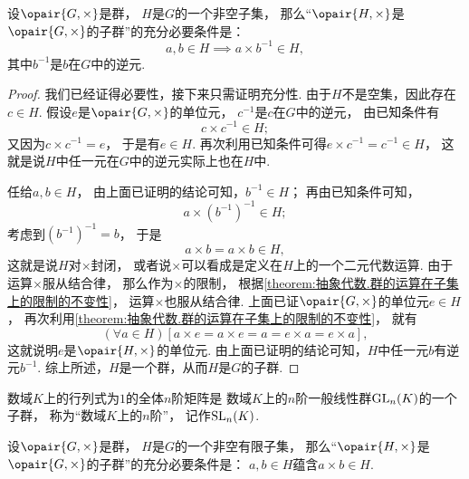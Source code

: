 \begin{theorem}
设\(\opair{G,\times}\)是群，
\(H\)是\(G\)的一个非空子集，
那么“\(\opair{H,\times}\)是\(\opair{G,\times}\)的子群”的充分必要条件是：\begin{equation*}
	a,b \in H \implies a \times b^{-1} \in H,
\end{equation*}
其中\(b^{-1}\)是\(b\)在\(G\)中的逆元.
\begin{proof}
我们已经证得必要性，接下来只需证明充分性.
由于\(H\)不是空集，因此存在\(c \in H\).
假设\(e\)是\(\opair{G,\times}\)的单位元，
\(c^{-1}\)是\(c\)在\(G\)中的逆元，
由已知条件有\begin{equation*}
	c \times c^{-1} \in H;
\end{equation*}
又因为\(c \times c^{-1} = e\)，
于是有\(e \in H\).
再次利用已知条件可得\(e \times c^{-1} = c^{-1} \in H\)，
这就是说\(H\)中任一元在\(G\)中的逆元实际上也在\(H\)中.

任给\(a,b \in H\)，
由上面已证明的结论可知，\(b^{-1} \in H\)；
再由已知条件可知，\begin{equation*}
	a \times (b^{-1})^{-1} \in H;
\end{equation*}
考虑到\((b^{-1})^{-1} = b\)，
于是\begin{equation*}
	a \times b = a \times b \in H,
\end{equation*}
这就是说\(H\)对\(\times\)封闭，
或者说\(\times\)可以看成是定义在\(H\)上的一个二元代数运算.
由于运算\(\times\)服从结合律，
那么作为\(\times\)的限制，
根据\cref{theorem:抽象代数.群的运算在子集上的限制的不变性}，
运算\(\times\)也服从结合律.
上面已证\(\opair{G,\times}\)的单位元\(e \in H\)，
再次利用\cref{theorem:抽象代数.群的运算在子集上的限制的不变性}，
就有\begin{equation*}
	(\forall a \in H)[
		a \times e = a \times e = a = e \times a = e \times a
	],
\end{equation*}
这就说明\(e\)是\(\opair{H,\times}\)的单位元.
由上面已证明的结论可知，\(H\)中任一元\(b\)有逆元\(b^{-1}\).
综上所述，\(H\)是一个群，从而\(H\)是\(G\)的子群.
\end{proof}
\end{theorem}

数域\(K\)上的行列式为\(1\)的全体\(n\)阶矩阵是
数域\(K\)上的\(n\)阶一般线性群\(\operatorname{GL}_n(K)\)的一个子群，
称为“数域\(K\)上的\(n\)阶”，
记作\(\operatorname{SL}_n(K)\).

\begin{corollary}
设\(\opair{G,\times}\)是群，
\(H\)是\(G\)的一个非空有限子集，
那么“\(\opair{H,\times}\)是\(\opair{G,\times}\)的子群”的充分必要条件是：
\(a,b \in H\)蕴含\(a \times b \in H\).
\end{corollary}

